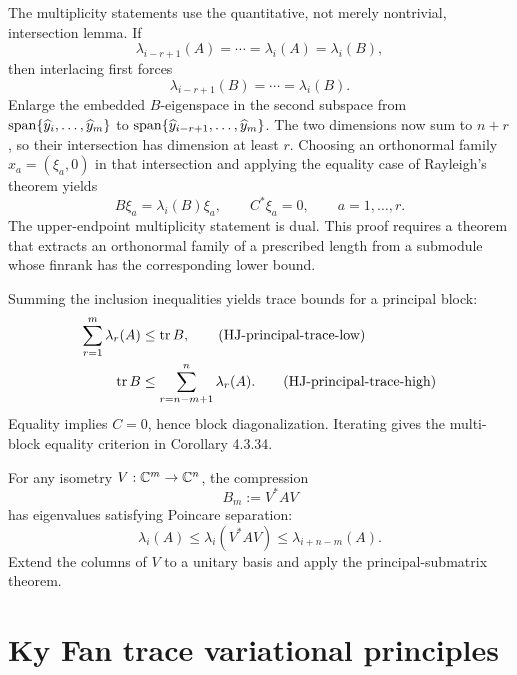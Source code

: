The multiplicity statements use the quantitative, not merely nontrivial, intersection lemma. If
\[
  \lambda_{i-r+1}(A)=\cdots=\lambda_i(A)=\lambda_i(B),
\]
then interlacing first forces
\[
  \lambda_{i-r+1}(B)=\cdots=\lambda_i(B).
\]
Enlarge the embedded $B$-eigenspace in the second subspace from
$\operatorname{span}\{\widehat y_i,\dots,\widehat y_m\}$ to
$\operatorname{span}\{\widehat y_{i-r+1},\dots,\widehat y_m\}$. The two dimensions now sum to $n+r$, so their intersection has dimension at least $r$. Choosing an orthonormal family $x_a=(\xi_a,0)$ in that intersection and applying the equality case of Rayleigh's theorem yields
\[
  B\xi_a=\lambda_i(B)\xi_a,
  \qquad C^*\xi_a=0,
  \qquad a=1,\dots,r.
\]
The upper-endpoint multiplicity statement is dual. This proof requires a theorem that extracts an orthonormal family of a prescribed length from a submodule whose finrank has the corresponding lower bound.

Summing the inclusion inequalities yields trace bounds for a principal block:
\begin{align}
  \sum_{r=1}^m\lambda_r(A)
  &\le \operatorname{tr} B, \tag{HJ-principal-trace-low}\\
  \operatorname{tr} B
  &\le\sum_{r=n-m+1}^n\lambda_r(A). \tag{HJ-principal-trace-high}
\end{align}
Equality implies $C=0$, hence block diagonalization. Iterating gives the multi-block equality criterion in Corollary 4.3.34.

For any isometry $V:\mathbb{C}^m\to\mathbb{C}^n$, the compression
\[
  B_m:=V^*AV
\]
has eigenvalues satisfying Poincare separation:
\begin{equation}
  \lambda_i(A)\le\lambda_i(V^*AV)\le\lambda_{i+n-m}(A). \tag{HJ-Poincare}
\end{equation}
Extend the columns of $V$ to a unitary basis and apply the principal-submatrix theorem.


\section{Ky Fan trace variational principles}


